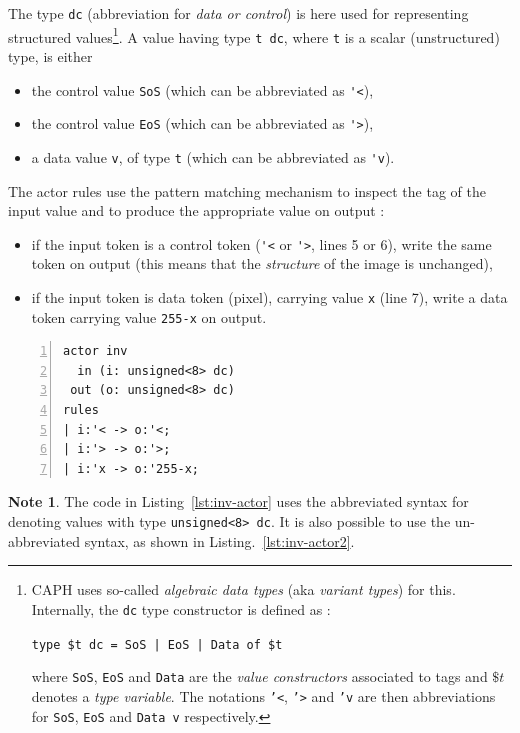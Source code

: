  The type \verb|dc| (abbreviation for \emph{data or
  control}) is here used for representing structured values\footnote{CAPH uses so-called
  \emph{algebraic data types} (aka \emph{variant types}) for this. Internally, the \texttt{dc} type
  constructor is defined as : 

\texttt{type \$t dc = SoS | EoS | Data of \$t}

where \texttt{SoS}, \texttt{EoS} and \texttt{Data} are the \emph{value
  constructors} associated to tags and $\$t$ denotes a \emph{type variable}. The notations
\texttt{'<}, \texttt{'>} and \texttt{'v} are then abbreviations for \texttt{SoS}, \texttt{EoS} and
\texttt{Data v} respectively.}.
A value having type \verb|t dc|, where
\verb|t| is a scalar (unstructured) type, is either
\begin{itemize}
\item the control value \verb|SoS| (which can be abbreviated as \verb|'<|),
\item the control value \verb|EoS| (which can be abbreviated as \verb|'>|),
\item a data value \verb|v|, of type \verb|t| (which can be abbreviated as \verb|'v|).
\end{itemize}

The actor rules use the pattern matching mechanism to inspect the tag of
the input value and to produce the appropriate value on output :
\begin{itemize}
\item if the input token is a control token (\verb|'<| or \verb|'>|, lines 5 or 6), write the same token on output
  (this means that the \emph{structure} of the image is unchanged),
\item if the input token is data token (pixel), carrying value \verb|x| (line 7), write a data token
  carrying value \verb|255-x| on output.
\end{itemize}

\begin{lstlisting}[style=CaphStyle,numbers=left,numberstyle=\tiny,caption={An actor computing image negatives in
    CAPH},label={lst:inv-actor}]
actor inv
  in (i: unsigned<8> dc)
 out (o: unsigned<8> dc)
rules
| i:'< -> o:'<;
| i:'> -> o:'>;
| i:'x -> o:'255-x;
\end{lstlisting}

\medskip
\textbf{Note 1}. The code in Listing~\ref{lst:inv-actor} uses the abbreviated syntax for denoting
values with type \verb|unsigned<8> dc|. It is also possible to use the un-abbreviated syntax, as
shown in Listing.~\ref{lst:inv-actor2}. 

